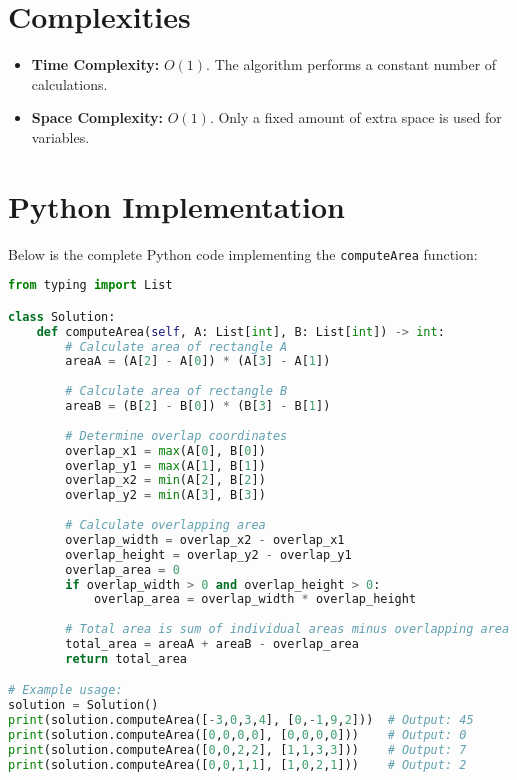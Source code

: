 \section*{Complexities}

\begin{itemize}
    \item \textbf{Time Complexity:} \(O(1)\). The algorithm performs a constant number of calculations.
    
    \item \textbf{Space Complexity:} \(O(1)\). Only a fixed amount of extra space is used for variables.
\end{itemize}

\section*{Python Implementation}


Below is the complete Python code implementing the \texttt{computeArea} function:

\begin{fullwidth}
\begin{lstlisting}[language=Python]
from typing import List

class Solution:
    def computeArea(self, A: List[int], B: List[int]) -> int:
        # Calculate area of rectangle A
        areaA = (A[2] - A[0]) * (A[3] - A[1])
        
        # Calculate area of rectangle B
        areaB = (B[2] - B[0]) * (B[3] - B[1])
        
        # Determine overlap coordinates
        overlap_x1 = max(A[0], B[0])
        overlap_y1 = max(A[1], B[1])
        overlap_x2 = min(A[2], B[2])
        overlap_y2 = min(A[3], B[3])
        
        # Calculate overlapping area
        overlap_width = overlap_x2 - overlap_x1
        overlap_height = overlap_y2 - overlap_y1
        overlap_area = 0
        if overlap_width > 0 and overlap_height > 0:
            overlap_area = overlap_width * overlap_height
        
        # Total area is sum of individual areas minus overlapping area
        total_area = areaA + areaB - overlap_area
        return total_area

# Example usage:
solution = Solution()
print(solution.computeArea([-3,0,3,4], [0,-1,9,2]))  # Output: 45
print(solution.computeArea([0,0,0,0], [0,0,0,0]))    # Output: 0
print(solution.computeArea([0,0,2,2], [1,1,3,3]))    # Output: 7
print(solution.computeArea([0,0,1,1], [1,0,2,1]))    # Output: 2
\end{lstlisting}
\end{fullwidth}

